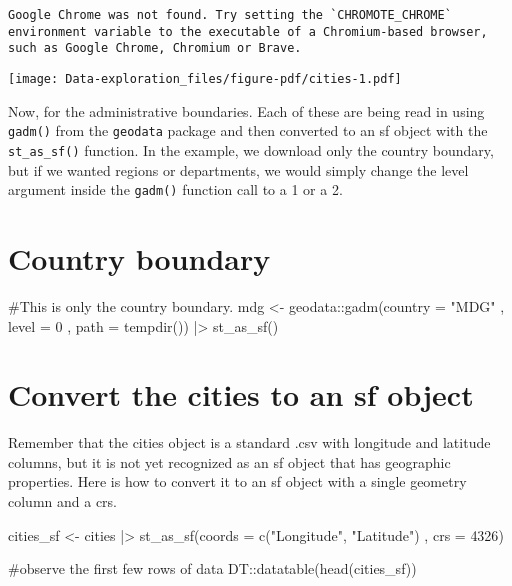 \documentclass[
  letterpaper,
  DIV=11,
  numbers=noendperiod]{scrreprt}
\newenvironment{Shaded}{\begin{snugshade}}{\end{snugshade}}
\newcommand{\AttributeTok}[1]{\textcolor[rgb]{0.40,0.45,0.13}{#1}}
\newcommand{\CommentTok}[1]{\textcolor[rgb]{0.37,0.37,0.37}{#1}}
\newcommand{\DecValTok}[1]{\textcolor[rgb]{0.68,0.00,0.00}{#1}}
\newcommand{\FunctionTok}[1]{\textcolor[rgb]{0.28,0.35,0.67}{#1}}
\newcommand{\NormalTok}[1]{\textcolor[rgb]{0.00,0.23,0.31}{#1}}
\newcommand{\OtherTok}[1]{\textcolor[rgb]{0.00,0.23,0.31}{#1}}
\newcommand{\SpecialCharTok}[1]{\textcolor[rgb]{0.37,0.37,0.37}{#1}}
\newcommand{\StringTok}[1]{\textcolor[rgb]{0.13,0.47,0.30}{#1}}
\begin{document}
\begin{verbatim}
Google Chrome was not found. Try setting the `CHROMOTE_CHROME` environment variable to the executable of a Chromium-based browser, such as Google Chrome, Chromium or Brave.
\end{verbatim}

\texttt{[image: Data-exploration\_files/figure-pdf/cities-1.pdf]}

Now, for the administrative boundaries. Each of these are being read in
using \texttt{gadm()} from the \texttt{geodata} package and then
converted to an sf object with the \texttt{st\_as\_sf()} function. In
the example, we download only the country boundary, but if we wanted
regions or departments, we would simply change the level argument inside
the \texttt{gadm()} function call to a 1 or a 2.

\section{Country boundary}\label{country-boundary}

\begin{Shaded}
\begin{Highlighting}[]
\CommentTok{\#This is only the country boundary. }
\NormalTok{mdg }\OtherTok{\textless{}{-}}\NormalTok{ geodata}\SpecialCharTok{::}\FunctionTok{gadm}\NormalTok{(}\AttributeTok{country =} \StringTok{"MDG"}
\NormalTok{                  , }\AttributeTok{level =} \DecValTok{0}
\NormalTok{                  , }\AttributeTok{path =} \FunctionTok{tempdir}\NormalTok{()) }\SpecialCharTok{|\textgreater{}}
  \FunctionTok{st\_as\_sf}\NormalTok{()}
\end{Highlighting}
\end{Shaded}

\section{Convert the cities to an sf
object}\label{convert-the-cities-to-an-sf-object}

Remember that the cities object is a standard .csv with longitude and
latitude columns, but it is not yet recognized as an sf object that has
geographic properties. Here is how to convert it to an sf object with a
single geometry column and a crs.

\begin{Shaded}
\begin{Highlighting}[]
\NormalTok{cities\_sf }\OtherTok{\textless{}{-}}\NormalTok{ cities }\SpecialCharTok{|\textgreater{}}
  \FunctionTok{st\_as\_sf}\NormalTok{(}\AttributeTok{coords =} \FunctionTok{c}\NormalTok{(}\StringTok{"Longitude"}\NormalTok{, }\StringTok{"Latitude"}\NormalTok{)}
\NormalTok{           , }\AttributeTok{crs =} \DecValTok{4326}\NormalTok{)}

\CommentTok{\#observe the first few rows of data}
\NormalTok{DT}\SpecialCharTok{::}\FunctionTok{datatable}\NormalTok{(}\FunctionTok{head}\NormalTok{(cities\_sf))}
\end{Highlighting}
\end{Shaded}
\end{document}
